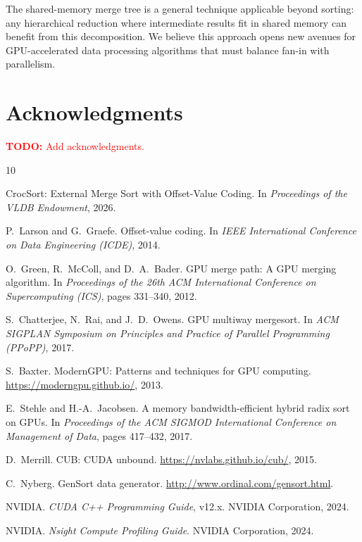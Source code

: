 \documentclass[conference,10pt]{IEEEtran}
\newcommand{\todo}[1]{\textcolor{red}{\textbf{TODO:} #1}}
\begin{document}
The shared-memory merge tree is a general technique applicable beyond
sorting: any hierarchical reduction where intermediate results fit in
shared memory can benefit from this decomposition.  We believe this
approach opens new avenues for GPU-accelerated data processing algorithms
that must balance fan-in with parallelism.


\section*{Acknowledgments}

\todo{Add acknowledgments.}




\begin{thebibliography}{10}

CrocSort: External Merge Sort with Offset-Value Coding.
\newblock In \emph{Proceedings of the VLDB Endowment}, 2026.

P.~Larson and G.~Graefe.
\newblock Offset-value coding.
\newblock In \emph{IEEE International Conference on Data Engineering (ICDE)}, 2014.

O.~Green, R.~McColl, and D.~A.~Bader.
\newblock GPU merge path: A GPU merging algorithm.
\newblock In \emph{Proceedings of the 26th ACM International Conference on
  Supercomputing (ICS)}, pages 331--340, 2012.

S.~Chatterjee, N.~Rai, and J.~D.~Owens.
\newblock GPU multiway mergesort.
\newblock In \emph{ACM SIGPLAN Symposium on Principles and Practice of
  Parallel Programming (PPoPP)}, 2017.

S.~Baxter.
\newblock ModernGPU: Patterns and techniques for GPU computing.
\newblock \url{https://moderngpu.github.io/}, 2013.

E.~Stehle and H.-A.~Jacobsen.
\newblock A memory bandwidth-efficient hybrid radix sort on GPUs.
\newblock In \emph{Proceedings of the ACM SIGMOD International Conference on
  Management of Data}, pages 417--432, 2017.

D.~Merrill.
\newblock CUB: CUDA unbound.
\newblock \url{https://nvlabs.github.io/cub/}, 2015.

C.~Nyberg.
\newblock GenSort data generator.
\newblock \url{http://www.ordinal.com/gensort.html}.

NVIDIA.
\newblock \emph{CUDA C++ Programming Guide}, v12.x.
\newblock NVIDIA Corporation, 2024.

NVIDIA.
\newblock \emph{Nsight Compute Profiling Guide}.
\newblock NVIDIA Corporation, 2024.

\end{thebibliography}
\end{document}
